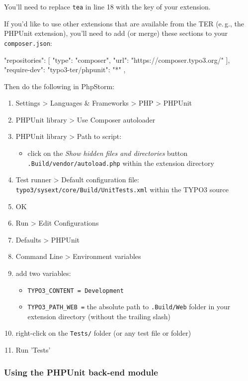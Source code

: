 \documentclass[a4paper,10pt,headsepline]{scrartcl}
\begin{document}
You'll need to replace \texttt{tea} in line 18 with the key of your extension.

If you'd like to use other extensions that are available from the TER (e.\,g., the PHPUnit extension), you'll need to add (or merge) these sections to your \texttt{composer.json}:

\begin{jsoncode}
"repositories": [
{
  "type": "composer",
  "url": "https://composer.typo3.org/"
}
],
"require-dev": {
  "typo3-ter/phpunit": "*"
},
\end{jsoncode}

Then do the following in PhpStorm:
\begin{enumerate}
  \item Settings > Languages \& Frameworks > PHP > PHPUnit
  \item PHPUnit library > Use Composer autoloader
  \item PHPUnit library > Path to script:
    \begin{itemize}
      \item click on the \emph{Show hidden files and directories} button
      \texttt{.Build/vendor/autoload.php} within the extension directory
    \end{itemize}
  \item Test runner > Default configuration file: \texttt{typo3/sysext/core/Build/UnitTests.xml} within the TYPO3 source
  \item OK
  \item Run > Edit Configurations
  \item Defaults > PHPUnit
  \item Command Line > Environment variables
  \item add two variables:
    \begin{itemize}
      \item \texttt{TYPO3\_CONTENT = Development}
      \item \texttt{TYPO3\_PATH\_WEB =} the absolute path to \texttt{.Build/Web} folder in your extension directory (without the trailing slash)
    \end{itemize}
  \item right-click on the \texttt{Tests/} folder (or any test file or folder)
  \item Run 'Tests'
\end{enumerate}



\subsubsection{Using the PHPUnit back-end module}
\end{document}
